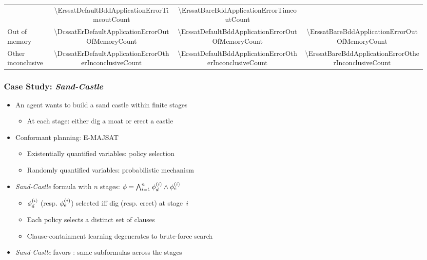 \begin{frame}
\begin{table}[t]
\begin{tabular}{l|ccc}
                                                   & \num{\ErssatDefaultBddApplicationErrorTimeoutCount}
                                                   & \num{\ErssatBareBddApplicationErrorTimeoutCount}                                       \\
            Out of memory                          & \num{\DcssatErDefaultApplicationErrorOutOfMemoryCount}
                                                   & \num{\ErssatDefaultBddApplicationErrorOutOfMemoryCount}
                                                   & \num{\ErssatBareBddApplicationErrorOutOfMemoryCount}                                   \\
            Other inconclusive                     & \num{\DcssatErDefaultApplicationErrorOtherInconclusiveCount}
                                                   & \num{\ErssatDefaultBddApplicationErrorOtherInconclusiveCount}
                                                   & \num{\ErssatBareBddApplicationErrorOtherInconclusiveCount}                             \\
            \bottomrule
        \end{tabular}
    \end{table}
\end{frame}

\begin{frame}
    \frametitle{Case Study: \textit{Sand-Castle}}
    \begin{itemize}
        \item An agent wants to build a sand castle within finite stages
              \begin{itemize}
                  \item At each stage: either dig a moat or erect a castle
              \end{itemize}
              \pause
        \item Conformant planning: E-MAJSAT
              \begin{itemize}
                  \item Existentially quantified variables: policy selection
                  \item Randomly quantified variables: probabilistic mechanism
              \end{itemize}
              \pause
        \item \textit{Sand-Castle} formula with $n$ stages: $\phi=\bigwedge_{i=1}^n \phi_d^{(i)}\land\phi_e^{(i)}$
              \begin{itemize}
                  \item $\phi_d^{(i)}$ (resp. $\phi_e^{(i)}$) selected iff dig (resp. erect) at stage~$i$
                  \item Each policy selects a distinct set of clauses
                  \item Clause-containment learning degenerates to brute-force search
              \end{itemize}
              \pause
        \item \textit{Sand-Castle} favors \dcssat: same subformulas  across the stages
    \end{itemize}
\end{frame}

